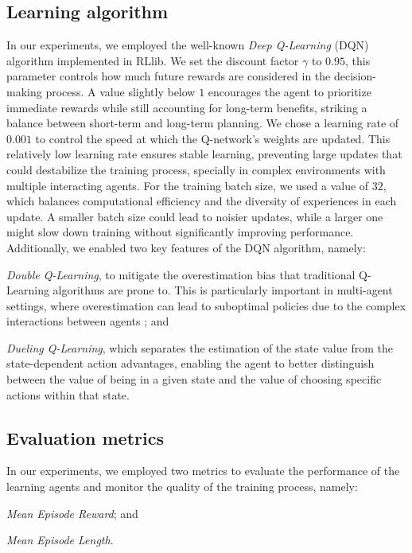 \documentclass[sigconf]{acmart}
\begin{document}
\subsection{Learning algorithm}
In our experiments, we employed the well-known \emph{Deep Q-Learning} (DQN) algorithm implemented in RLlib.
%
We set the discount factor $\gamma$ to $0.95$, this parameter controls how much future rewards are 
  considered in the decision-making process.
%
A value slightly below $1$ encourages the agent to prioritize immediate rewards while still accounting 
  for long-term benefits, striking a balance between short-term and long-term planning.
%
We chose a learning rate of $0.001$ to control the speed at which the Q-network's weights are updated.
%
This relatively low learning rate ensures stable learning, preventing large updates that could destabilize 
  the training process, specially in complex environments with multiple interacting agents.
%
For the training batch size, we used a value of $32$, which balances computational efficiency and the diversity 
  of experiences in each update. 
%
A smaller batch size could lead to noisier updates, while a larger one might slow down training without
  significantly improving performance.
%
Additionally, we enabled two key features of the DQN algorithm, namely:
  \begin{enumerate*}[label=(\roman*)]
    \item \emph{Double Q-Learning}, to mitigate the overestimation bias that traditional Q-Learning algorithms are prone to. 
      This is particularly important in multi-agent settings, where overestimation can lead to suboptimal policies due to 
      the complex interactions between agents ; and
    \item \emph{Dueling Q-Learning}, which separates the estimation of the state value from the state-dependent action advantages, 
      enabling the agent to better distinguish between the value of being in a given state and the value of choosing 
      specific actions within that state.
  \end{enumerate*} 

\subsection{Evaluation metrics} 
In our experiments, we employed two metrics to evaluate the performance of the learning
  agents and monitor the quality of the training process, namely: 
  \begin{enumerate*}[label=(\roman*)]
    \item \emph{Mean Episode Reward}; and
    \item \emph{Mean Episode Length}.
  \end{enumerate*} 
\end{document}
